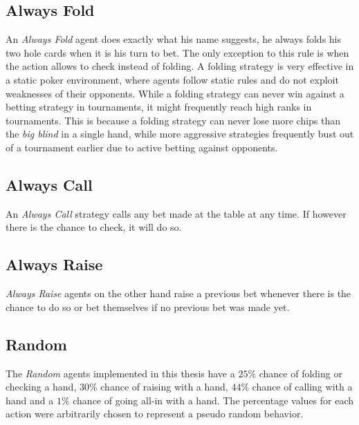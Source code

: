 \subsection{Always Fold}
An \textit{Always Fold} agent does exactly what his name suggests, he always folds his two hole cards when it is his turn to bet. The only exception to this rule is when the action allows to check instead of folding. A folding strategy is very effective in a static poker environment, where agents follow static rules and do not exploit weaknesses of their opponents. While a folding strategy can never win against a betting strategy in tournaments, it might frequently reach high ranks in tournaments. This is because a folding strategy can never lose more chips than the \textit{big blind} in a single hand, while more aggressive strategies frequently bust out of a tournament earlier due to active betting against opponents.
\subsection{Always Call}
An \textit{Always Call} strategy calls any bet made at the table at any time. If however there is the chance to check, it will do so. 
\subsection{Always Raise}
\textit{Always Raise} agents on the other hand raise a previous bet whenever there is the chance to do so or bet themselves if no previous bet was made yet. 
\subsection{Random}
The \textit{Random} agents implemented in this thesis have a $25\%$ chance of folding or checking a hand, $30\%$ chance of raising with a hand, $44\%$ chance of calling with a hand and a $1\%$ chance of going all-in with a hand. The percentage values for each action were arbitrarily chosen to represent a pseudo random behavior.

